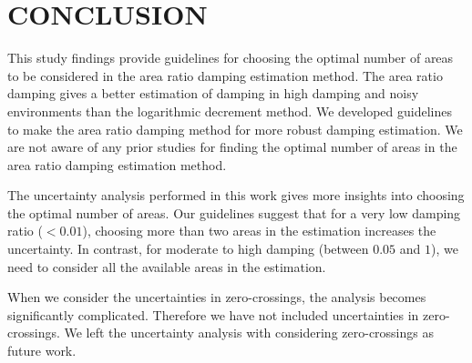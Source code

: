\section{CONCLUSION}
\label{sec:conclusion}
This study findings provide guidelines for choosing the optimal number of areas to be considered in the area ratio damping estimation method. The area ratio damping gives a better estimation of damping in high damping and noisy environments than the logarithmic decrement method. We developed guidelines to make the area ratio damping method for more robust damping estimation. We are not aware of any prior studies for finding the optimal number of areas in the area ratio damping estimation method.

The uncertainty analysis performed in this work gives more insights into choosing the optimal number of areas. Our guidelines suggest that for a very low damping ratio ($<0.01$), choosing more than two areas in the estimation increases the uncertainty.
In contrast, for moderate to high damping (between $0.05$ and $1$), we need to consider all the available areas in the estimation.

When we consider the uncertainties in zero-crossings, the analysis becomes significantly complicated. Therefore we have not included uncertainties in zero-crossings. We left the uncertainty analysis with considering zero-crossings  as future work.